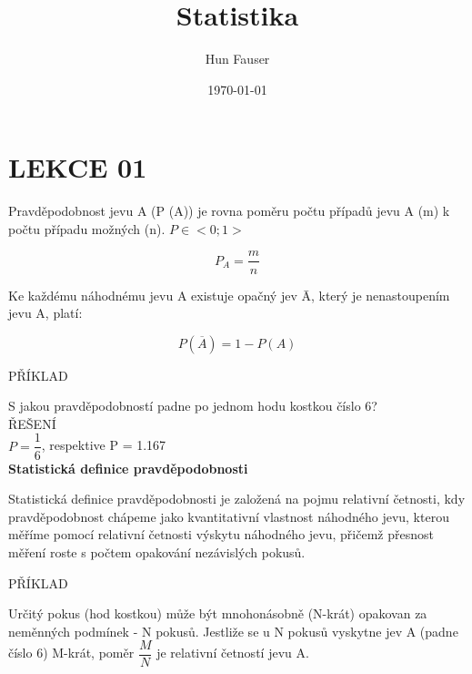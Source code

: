 \documentclass[a4paper,12pt]{article}
\title{Statistika}
\author{Hun Fauser}
\date{\today}
\begin{document}

\maketitle

\section{LEKCE 01}

Pravděpodobnost jevu A (P (A)) je rovna poměru počtu případů jevu A (m) 
k počtu případu možných (n). $P\in<0;1>$

\[  P_{A} = \frac{m}{n} \]

Ke každému náhodnému jevu A existuje opačný jev \={A}, který je nenastoupením jevu A, platí:

\[  P (\overline{A}) = 1 - P(A) \]

PŘÍKLAD

S jakou pravděpodobností padne po jednom hodu kostkou číslo 6? \\

ŘEŠENÍ \\

$P = \dfrac{1}{6}$, respektive P = 1.167 \\

\Large \textbf{Statistická definice pravděpodobnosti}

\normalsize
Statistická definice pravděpodobnosti je založená na pojmu relativní četnosti, 
kdy pravděpodobnost chápeme jako kvantitativní vlastnost náhodného jevu, 
kterou měříme pomocí relativní četnosti výskytu náhodného jevu, přičemž 
přesnost měření roste s počtem opakování nezávislých pokusů.

PŘÍKLAD

Určitý pokus (hod kostkou) může být mnohonásobně (N-krát) opakovan 
za neměnných podmínek - N pokusů. Jestliže se u N pokusů vyskytne jev A (padne číslo 6)
M-krát, poměr $\dfrac{M}{N}$ je relativní četností jevu A.
\end{document}
